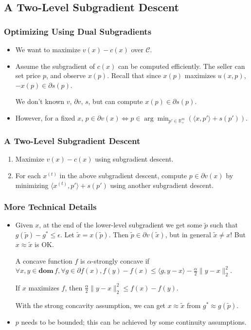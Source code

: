 \documentclass{beamer}
\begin{document}
\subsection{A Two-Level Subgradient Descent}
\begin{frame}
    \frametitle{Optimizing Using Dual Subgradients}
    \begin{itemize}
        \item We want to maximize $v(x)-c(x)$ over $\mathcal{C}$.

        \item Assume the subgradient of $c(x)$ can be computed efficiently. The seller can set price $p$, and observe $x(p)$. Recall that since $x(p)$ maximizes $u(x,p)$, $-x(p)\in\partial s(p)$.

        We don't known $v$, $\partial v$, $s$, but can compute $x(p)\in\partial s(p)$.

        \item However, for a fixed $x$, $p \in \partial v(x)\iff p \in \arg\min_{p'\in \mathbb{R}_+^m} ( \langle x,p'\rangle + s(p') )$.
\end{itemize}
\end{frame}

\begin{frame}
    \frametitle{A Two-Level Subgradient Descent}
    \begin{enumerate}
        \item Maximize $v(x)-c(x)$ using subgradient descent.
        \item For each $x^{(t)}$ in the above subgradient descent, compute $p\in\partial v(x)$ by minimizing $\langle x^{(t)},p'\rangle+s(p')$ using another subgradient descent.
    \end{enumerate}
\end{frame}

\begin{frame}
    \frametitle{More Technical Details}
    \begin{itemize}
        \item Given $x$, at the end of the lower-level subgradient we get some $\tilde{p}$ such that $g(\tilde{p})-g^*\le\epsilon$. Let $\tilde{x}=x(\tilde{p})$. Then $\tilde{p}\in\partial v(\tilde{x})$, but in general $\tilde{x}\ne x$! But $x\approx\tilde{x}$ is OK.

        A concave function $f$ is $\alpha$-strongly concave if $\forall x,y\in \mathbf{dom}\,f,\forall g\in\partial f(x), f(y)-f(x)\le \langle g,y-x\rangle-\frac{\alpha}{2}\|y-x\|_2^2$.

        If $x$ maximizes $f$, then $\frac{\alpha}{2}\|y-x\|_2^2\le f(x)-f(y)$.

        With the strong concavity assumption, we can get $x\approx\tilde{x}$ from $g^*\approx g(\tilde{p})$.
        \item $p$ needs to be bounded; this can be achieved by some continuity assumptions.
    \end{itemize}
\end{frame}
\end{document}
